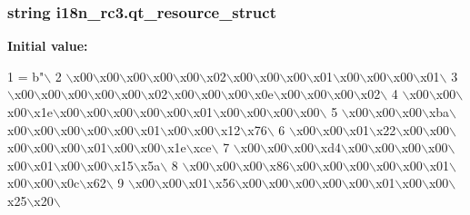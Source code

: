 \subsubsection[{qt\+\_\+resource\+\_\+struct}]{\setlength{\rightskip}{0pt plus 5cm}string i18n\+\_\+rc3.\+qt\+\_\+resource\+\_\+struct}\label{namespacei18n__rc3_a674d1293de4968c18f7b64095aa3e68a}
{\bfseries Initial value\+:}
\begin{DoxyCode}
1 = b\textcolor{stringliteral}{"\(\backslash\)}
2 \textcolor{stringliteral}{\(\backslash\)x00\(\backslash\)x00\(\backslash\)x00\(\backslash\)x00\(\backslash\)x00\(\backslash\)x02\(\backslash\)x00\(\backslash\)x00\(\backslash\)x00\(\backslash\)x01\(\backslash\)x00\(\backslash\)x00\(\backslash\)x00\(\backslash\)x01\(\backslash\)}
3 \textcolor{stringliteral}{\(\backslash\)x00\(\backslash\)x00\(\backslash\)x00\(\backslash\)x00\(\backslash\)x00\(\backslash\)x02\(\backslash\)x00\(\backslash\)x00\(\backslash\)x00\(\backslash\)x0e\(\backslash\)x00\(\backslash\)x00\(\backslash\)x00\(\backslash\)x02\(\backslash\)}
4 \textcolor{stringliteral}{\(\backslash\)x00\(\backslash\)x00\(\backslash\)x00\(\backslash\)x1e\(\backslash\)x00\(\backslash\)x00\(\backslash\)x00\(\backslash\)x00\(\backslash\)x00\(\backslash\)x01\(\backslash\)x00\(\backslash\)x00\(\backslash\)x00\(\backslash\)x00\(\backslash\)}
5 \textcolor{stringliteral}{\(\backslash\)x00\(\backslash\)x00\(\backslash\)x00\(\backslash\)xba\(\backslash\)x00\(\backslash\)x00\(\backslash\)x00\(\backslash\)x00\(\backslash\)x00\(\backslash\)x01\(\backslash\)x00\(\backslash\)x00\(\backslash\)x12\(\backslash\)x76\(\backslash\)}
6 \textcolor{stringliteral}{\(\backslash\)x00\(\backslash\)x00\(\backslash\)x01\(\backslash\)x22\(\backslash\)x00\(\backslash\)x00\(\backslash\)x00\(\backslash\)x00\(\backslash\)x00\(\backslash\)x01\(\backslash\)x00\(\backslash\)x00\(\backslash\)x1e\(\backslash\)xce\(\backslash\)}
7 \textcolor{stringliteral}{\(\backslash\)x00\(\backslash\)x00\(\backslash\)x00\(\backslash\)xd4\(\backslash\)x00\(\backslash\)x00\(\backslash\)x00\(\backslash\)x00\(\backslash\)x00\(\backslash\)x01\(\backslash\)x00\(\backslash\)x00\(\backslash\)x15\(\backslash\)x5a\(\backslash\)}
8 \textcolor{stringliteral}{\(\backslash\)x00\(\backslash\)x00\(\backslash\)x00\(\backslash\)x86\(\backslash\)x00\(\backslash\)x00\(\backslash\)x00\(\backslash\)x00\(\backslash\)x00\(\backslash\)x01\(\backslash\)x00\(\backslash\)x00\(\backslash\)x0c\(\backslash\)x62\(\backslash\)}
9 \textcolor{stringliteral}{\(\backslash\)x00\(\backslash\)x00\(\backslash\)x01\(\backslash\)x56\(\backslash\)x00\(\backslash\)x00\(\backslash\)x00\(\backslash\)x00\(\backslash\)x00\(\backslash\)x01\(\backslash\)x00\(\backslash\)x00\(\backslash\)x25\(\backslash\)x20\(\backslash\)}

\end{DoxyCode}
